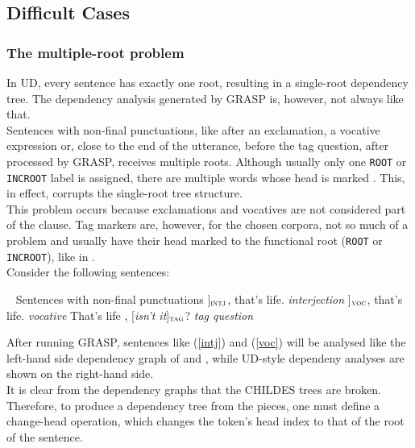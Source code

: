 \subsection{Difficult Cases}\label{sec:grdifficult}
\subsubsection{The multiple-root problem}
In UD, every sentence has exactly one root, resulting in a single-root dependency tree. The dependency analysis generated by GRASP is, however, not always like that.\\

Sentences with non-final punctuations, like after an exclamation, a vocative expression or, close to the end of the utterance, before the tag question, after processed by GRASP, receives multiple roots. Although usually only one \texttt{ROOT} or \texttt{INCROOT} label is assigned, there are multiple words whose head is marked . This, in effect, corrupts the single-root tree structure.\\

This problem occurs because exclamations and vocatives are not considered part of the clause. Tag markers are, however, for the chosen corpora, not so much of a problem and usually have their head marked to the functional root (\texttt{ROOT} or \texttt{INCROOT}), like in .\\

Consider the following sentences:

\pex~ Sentences with non-final punctuations\label{roots}
\a {[\sl Well\/}]$_{\text{\sc intj}}$, that's life.        \hfill {\sl interjection}\label{intj}
\a {[\sl  Son\/}]$_{\text{\sc voc}}$, that's life.         \hfill {\sl vocative}\label{voc}
\a That's life , {[\sl isn't it}]$_{\text{\sc tag}}$?    \hfill {\sl tag question}\label{tagq}
\xe


After running GRASP, sentences like (\ref{intj}) and (\ref{voc}) will be analysed like the left-hand side dependency graph of  and , while UD-style dependeny analyses are shown on the right-hand side.\\


It is clear from the dependency graphs that the CHILDES trees are broken. Therefore, to produce a dependency tree from the pieces, one must define a change-head operation, which changes the token's head index to that of the root of the sentence.\\


